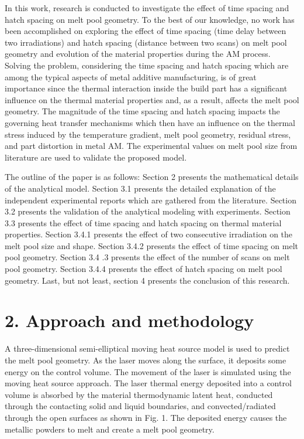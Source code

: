 \documentclass[10pt]{article}
\begin{document}
In this work, research is conducted to investigate the effect of time spacing and hatch spacing on melt pool geometry. To the best of our knowledge, no work has been accomplished on exploring the effect of time spacing (time delay between two irradiations) and hatch spacing (distance between two scans) on melt pool geometry and evolution of the material properties during the AM process. Solving the problem, considering the time spacing and hatch spacing which are among the typical aspects of metal additive manufacturing, is of great importance since the thermal interaction inside the build part has a significant influence on the thermal material properties and, as a result, affects the melt pool geometry. The magnitude of the time spacing and hatch spacing impacts the governing heat transfer mechanisms which then have an influence on the thermal stress induced by the temperature gradient, melt pool geometry, residual stress, and part distortion in metal AM. The experimental values on melt pool size from literature are used to validate the proposed model.

The outline of the paper is as follows: Section 2 presents the mathematical details of the analytical model. Section 3.1 presents the detailed explanation of the independent experimental reports which are gathered from the literature. Section 3.2 presents the validation of the analytical modeling with experiments. Section 3.3 presents the effect of time spacing and hatch spacing on thermal material properties. Section 3.4.1 presents the effect of two consecutive irradiation on the melt pool size and shape. Section 3.4.2 presents the effect of time spacing on melt pool geometry. Section 3.4 .3 presents the effect of the number of scans on melt pool geometry. Section 3.4.4 presents the effect of hatch spacing on melt pool geometry. Last, but not least, section 4 presents the conclusion of this research.

\section*{2. Approach and methodology}
A three-dimensional semi-elliptical moving heat source model is used to predict the melt pool geometry. As the laser moves along the surface, it deposits some energy on the control volume. The movement of the laser is simulated using the moving heat source approach. The laser thermal energy deposited into a control volume is absorbed by the material thermodynamic latent heat, conducted through the contacting solid and liquid boundaries, and convected/radiated through the open surfaces as shown in Fig. 1. The deposited energy causes the metallic powders to melt and create a melt pool geometry.
\end{document}
